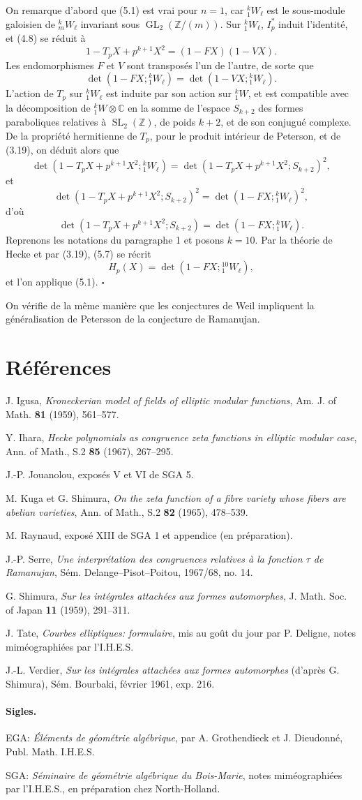 \documentclass[10pt]{article}
\newcommand{\C}{\mathbb C}
\newcommand{\Z}{\mathbb Z}
\newcommand{\GL}{\operatorname{GL}}
\newcommand{\SL}{\operatorname{SL}}
\newcommand{\QED}{\hfill$\square$}
\begin{document}
On remarque d'abord que (5.1) est vrai pour $n=1$, car ${}^k_1W_\ell$ est le sous-module galoisien de ${}^k_mW_\ell$ invariant sous $\GL_2(\Z/(m))$. Sur ${}^k_1W_\ell$, $I_p^*$ induit l'identité, et (4.8) se réduit à
\[
1-T_pX+p^{k+1}X^2=(1-FX)(1-VX).
\]
Les endomorphismes $F$ et $V$ sont transposés l'un de l'autre, de sorte que
\[
\det(1-FX;{}^k_1W_\ell)=\det(1-VX;{}^k_1W_\ell).
\]
L'action de $T_p$ sur ${}^k_1W_\ell$ est induite par son action sur ${}^k_1W$, et est compatible avec la décomposition de ${}^k_1W\otimes\C$ en la somme de l'espace $S_{k+2}$ des formes paraboliques relatives à $\SL_2(\Z)$, de poids $k+2$, et de son conjugué complexe. De la propriété hermitienne de $T_p$, pour le produit intérieur de Peterson, et de (3.19), on déduit alors que
\[
\det(1-T_pX+p^{k+1}X^2;{}^k_1W_\ell)=\det(1-T_pX+p^{k+1}X^2;S_{k+2})^2,
\]
et
\[
\det(1-T_pX+p^{k+1}X^2;S_{k+2})^2=\det(1-FX;{}^k_1W_\ell)^2,
\]
d'où
\[
\det(1-T_pX+p^{k+1}X^2;S_{k+2})=\det(1-FX;{}^k_1W_\ell).
\tag{5.7}
\]
Reprenons les notations du paragraphe 1 et posons $k=10$. Par la théorie de Hecke et par (3.19), (5.7) se récrit
\[
H_p(X)=\det(1-FX;{}^{10}_1W_\ell),
\]
et l'on applique (5.1). \QED

On vérifie de la même manière que les conjectures de Weil impliquent la généralisation de Petersson de la conjecture de Ramanujan.

\section*{Références}
\begin{enumerate}[label={[\arabic*]},leftmargin=2.6em]
\item J. Igusa, \emph{Kroneckerian model of fields of elliptic modular functions}, Am. J. of Math. \textbf{81} (1959), 561--577.
\item Y. Ihara, \emph{Hecke polynomials as congruence zeta functions in elliptic modular case}, Ann. of Math., S.2 \textbf{85} (1967), 267--295.
\item J.-P. Jouanolou, exposés V et VI de SGA 5.
\item M. Kuga et G. Shimura, \emph{On the zeta function of a fibre variety whose fibers are abelian varieties}, Ann. of Math., S.2 \textbf{82} (1965), 478--539.
\item M. Raynaud, exposé XIII de SGA 1 et appendice (en préparation).
\item J.-P. Serre, \emph{Une interprétation des congruences relatives à la fonction $\tau$ de Ramanujan}, Sém. Delange--Pisot--Poitou, 1967/68, no. 14.
\item G. Shimura, \emph{Sur les intégrales attachées aux formes automorphes}, J. Math. Soc. of Japan \textbf{11} (1959), 291--311.
\item J. Tate, \emph{Courbes elliptiques: formulaire}, mis au goût du jour par P. Deligne, notes miméographiées par l'I.H.E.S.
\item J.-L. Verdier, \emph{Sur les intégrales attachées aux formes automorphes} (d'après G. Shimura), Sém. Bourbaki, février 1961, exp. 216.
\end{enumerate}

\paragraph{Sigles.}
EGA: \emph{Éléments de géométrie algébrique}, par A. Grothendieck et J. Dieudonné, Publ. Math. I.H.E.S.

SGA: \emph{Séminaire de géométrie algébrique du Bois-Marie}, notes miméographiées par l'I.H.E.S., en préparation chez North-Holland.
\end{document}
